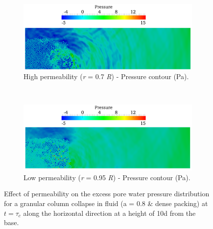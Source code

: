 \begin{figure}
\ContinuedFloat
\begin{subfigure}[t]{0.975\textwidth}
	\centering
    \includegraphics[width=\textwidth]{a08/r07_PWP_ini_press_dense}
    \caption{High permeability (\textit{r} = 0.7 \textit{R}) - Pressure contour 
    (Pa).}
    \label{fig:r07_PWPress_ini_dense}
\end{subfigure} \\
\begin{subfigure}[t]{0.975\textwidth}
	\centering
    \includegraphics[width=\textwidth]{a08/r095_PWP_ini_press_dense}
    \caption{Low permeability (\textit{r} = 0.95 \textit{R}) - Pressure contour 
    (Pa).}
    \label{fig:r095_PWPress_ini_dense}
\end{subfigure}

\caption{Effect of permeability on the excess pore water pressure distribution 
for a granular column collapse in fluid (a = 0.8 \& dense packing) at $t = 
\tau_c$ along the horizontal direction at a height of 10d from the base.}
\label{fig:PWP_ini_dense}
\end{figure}

